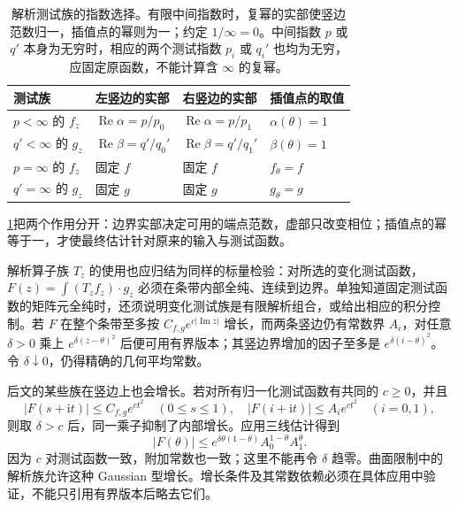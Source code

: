 \begin{table}[htbp]
\centering
\caption[解析测试族的指数选择]{解析测试族的指数选择。有限中间指数时，复幂的实部使竖边范数归一，插值点的幂则为一；约定 \(1/\infty=0\)。中间指数 \(p\) 或 \(q'\) 本身为无穷时，相应的两个测试指数 \(p_i\) 或 \(q_i'\) 也均为无穷，应固定原函数，不能计算含 \(\infty\) 的复幂。}
\label{b2:tab:17-analytic-test-exponents}
\begin{tabularx}{\linewidth}{@{}p{9.4em}XXX@{}}
\toprule
测试族 & 左竖边的实部 & 右竖边的实部 & 插值点的取值\\
\midrule
\(p<\infty\) 的 \(f_z\) & \(\operatorname{Re}\alpha=p/p_0\) & \(\operatorname{Re}\alpha=p/p_1\) & \(\alpha(\theta)=1\)\\
\(q'<\infty\) 的 \(g_z\) & \(\operatorname{Re}\beta=q'/q_0'\) & \(\operatorname{Re}\beta=q'/q_1'\) & \(\beta(\theta)=1\)\\
\(p=\infty\) 的 \(f_z\) & 固定 \(f\) & 固定 \(f\) & \(f_\theta=f\)\\
\(q'=\infty\) 的 \(g_z\) & 固定 \(g\) & 固定 \(g\) & \(g_\theta=g\)\\
\bottomrule
\end{tabularx}
\end{table}
\cref{b2:tab:17-analytic-test-exponents}把两个作用分开：边界实部决定可用的端点范数，虚部只改变相位；插值点的幂等于一，才使最终估计针对原来的输入与测试函数。

\ProseParagraphBreak

解析算子族 \(T_z\) 的使用也应归结为同样的标量检验：对所选的变化测试函数，\(F(z)=\int(T_zf_z)\cdot g_z\) 必须在条带内部全纯、连续到边界。单独知道固定测试函数的矩阵元全纯时，还须说明变化测试族是有限解析组合，或给出相应的积分控制。若 \(F\) 在整个条带至多按 \(C_{f,g}e^{c|\operatorname{Im}z|}\) 增长，而两条竖边仍有常数界 \(A_i\)，对任意 \(\delta>0\) 乘上 \(e^{\delta(z-\theta)^2}\) 后便可用有界版本；其竖边界增加的因子至多是 \(e^{\delta(i-\theta)^2}\)。令 \(\delta\downarrow0\)，仍得精确的几何平均常数。

\ProseParagraphBreak

后文的某些族在竖边上也会增长。若对所有归一化测试函数有共同的 \(c\geq0\)，并且
\[
 |F(s+\mathrm it)|\leq C_{f,g}e^{ct^2}
 \quad(0\leq s\leq1),
 \quad |F(i+\mathrm it)|\leq A_i e^{ct^2}\quad(i=0,1),
\]
则取 \(\delta>c\) 后，同一乘子抑制了内部增长。应用三线估计得到
\[
 |F(\theta)|
 \leq e^{\delta\theta(1-\theta)}A_0^{1-\theta}A_1^\theta.
\]
因为 \(c\) 对测试函数一致，附加常数也一致；这里不能再令 \(\delta\) 趋零。曲面限制中的解析族允许这种 Gaussian 型增长。增长条件及其常数依赖必须在具体应用中验证，不能只引用有界版本后略去它们。

